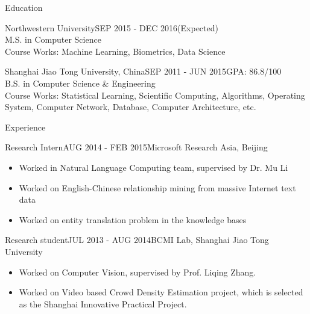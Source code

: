 \documentclass{resume} %
\begin{document}

\begin{rSection}{Education}
\begin{rSubsection}{Northwestern University}{SEP 2015 - DEC 2016(Expected)}{}\\
M.S. in Computer Science\\
Course Works: Machine Learning, Biometrics, Data Science
\end{rSubsection}
\vspace{5pt}
\begin{rSubsection}{Shanghai Jiao Tong University, China}{SEP 2011 - JUN 2015}{\quad GPA: {86.8/100}}\\
B.S. in Computer Science \& Engineering\\
Course Works: Statistical Learning, Scientific Computing, Algorithms,  Operating System, Computer Network, Database, Computer Architecture, etc.
\end{rSubsection}
\end{rSection}
\vspace{10pt}

\begin{rSection}{Experience}
\begin{rSubsection}{Research Intern}{AUG 2014 - FEB 2015}{Microsoft Research Asia, Beijing}
\begin{itemize}
\item Worked in Natural Language Computing team, supervised by Dr. Mu Li
\item Worked on English-Chinese relationship mining from massive Internet text data
\item Worked on entity translation problem in the knowledge bases
\end{itemize}
\end{rSubsection}
\vspace{5pt}
\begin{rSubsection}{Research student}{JUL 2013 - AUG 2014}{BCMI Lab, Shanghai Jiao Tong University}
\begin{itemize}
\item Worked on Computer Vision, supervised by Prof. Liqing Zhang.
\item Worked on Video based Crowd Density Estimation project, which is selected as the Shanghai Innovative Practical Project.
\end{itemize}
\end{rSubsection}
\end{rSection}
\vspace{10pt}
\end{document}
